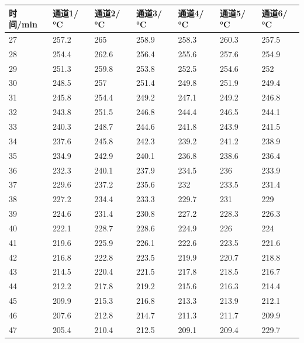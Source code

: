 \documentclass[12pt,hyperref,a4paper,UTF8]{ctexart}
\begin{document}
\begin{table}[htp]
\centering
\begin{tabular}{|l|l|l|l|l|l|l|}
\hline
时间/min & 通道1/°C & 通道2/°C & 通道3/°C & 通道4/°C & 通道5/°C & 通道6/°C \\ \hline
27     & 257.2  & 265    & 258.9  & 258.3  & 260.3  & 257.5  \\ \hline
28     & 254.4  & 262.6  & 256.4  & 255.6  & 257.6  & 254.9  \\ \hline
29     & 251.3  & 259.8  & 253.8  & 252.5  & 254.6  & 252    \\ \hline
30     & 248.5  & 257    & 251.4  & 249.8  & 251.9  & 249.4  \\ \hline
31     & 245.8  & 254.4  & 249.2  & 247.1  & 249.2  & 246.8  \\ \hline
32     & 243.8  & 251.5  & 246.8  & 244.4  & 246.5  & 244.1  \\ \hline
33     & 240.3  & 248.7  & 244.6  & 241.8  & 243.9  & 241.5  \\ \hline
34     & 237.6  & 245.8  & 242.3  & 239.2  & 241.2  & 238.9  \\ \hline
35     & 234.9  & 242.9  & 240.1  & 236.8  & 238.6  & 236.4  \\ \hline
36     & 232.3  & 240.1  & 237.9  & 234.5  & 236    & 233.9  \\ \hline
37     & 229.6  & 237.2  & 235.6  & 232    & 233.5  & 231.4  \\ \hline
38     & 227.2  & 234.4  & 233.3  & 229.7  & 231    & 229    \\ \hline
39     & 224.6  & 231.4  & 230.8  & 227.2  & 228.3  & 226.3  \\ \hline
40     & 222.1  & 228.7  & 228.6  & 224.9  & 226    & 224    \\ \hline
41     & 219.6  & 225.9  & 226.1  & 222.6  & 223.5  & 221.6  \\ \hline
42     & 216.8  & 222.8  & 223.5  & 219.9  & 220.7  & 218.8  \\ \hline
43     & 214.5  & 220.4  & 221.5  & 217.8  & 218.5  & 216.7  \\ \hline
44     & 212.2  & 217.8  & 219.2  & 215.6  & 216.3  & 214.4  \\ \hline
45     & 209.9  & 215.3  & 216.8  & 213.3  & 213.9  & 212.1  \\ \hline
46     & 207.6  & 212.8  & 214.7  & 211.3  & 211.7  & 209.9  \\ \hline
47     & 205.4  & 210.4  & 212.5  & 209.1  & 209.4  & 229.7  \\ \hline

\end{tabular}
\end{table}
\end{document}
